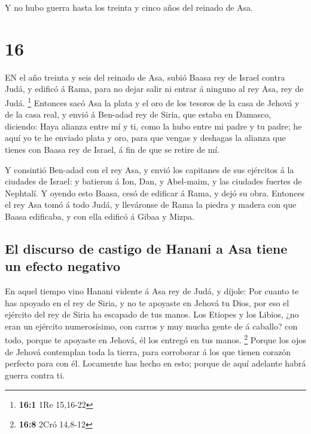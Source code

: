  Y no hubo guerra hasta los treinta y cinco años del
reinado de Asa.

\hypertarget{section-15}{%
\section{16}\label{section-15}}

 EN el año treinta y seis del reinado de Asa, subió Baasa
rey de Israel contra Judá, y edificó á Rama, para no dejar salir ni
entrar á ninguno al rey Asa, rey de Judá. \footnote{\textbf{16:1} 1Re
  15,16-22}  Entonces sacó Asa la plata y el oro de los
tesoros de la casa de Jehová y de la casa real, y envió á Ben-adad rey
de Siria, que estaba en Damasco, diciendo:  Haya alianza
entre mí y ti, como la hubo entre mi padre y tu padre; he aquí yo te he
enviado plata y oro, para que vengas y deshagas la alianza que tienes
con Baasa rey de Israel, á fin de que se retire de mí.

 Y consintió Ben-adad con el rey Asa, y envió los capitanes
de sus ejércitos á la ciudades de Israel: y batieron á Ion, Dan, y
Abel-maim, y las ciudades fuertes de Nephtalí.  Y oyendo
esto Baasa, cesó de edificar á Rama, y dejó su obra. 
Entonces el rey Asa tomó á todo Judá, y lleváronse de Rama la piedra y
madera con que Baasa edificaba, y con ella edificó á Gibaa y Mizpa.

\hypertarget{el-discurso-de-castigo-de-hanani-a-asa-tiene-un-efecto-negativo}{%
\subsection{El discurso de castigo de Hanani a Asa tiene un efecto
negativo}\label{el-discurso-de-castigo-de-hanani-a-asa-tiene-un-efecto-negativo}}

 En aquel tiempo vino Hanani vidente á Asa rey de Judá, y
díjole: Por cuanto te has apoyado en el rey de Siria, y no te apoyaste
en Jehová tu Dios, por eso el ejército del rey de Siria ha escapado de
tus manos.  Los Etiopes y los Libios, ¿no eran un ejército
numerosísimo, con carros y muy mucha gente de á caballo? con todo,
porque te apoyaste en Jehová, él los entregó en tus manos. \footnote{\textbf{16:8}
  2Cró 14,8-12}  Porque los ojos de Jehová contemplan toda
la tierra, para corroborar á los que tienen corazón perfecto para con
él. Locamente has hecho en esto; porque de aquí adelante habrá guerra
contra ti.

